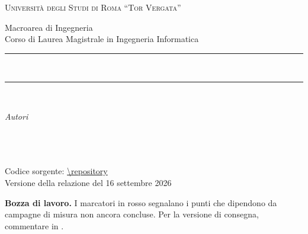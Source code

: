 \begin{titlepage}
\centering
\thispagestyle{empty}

\vspace*{1.2cm}

{\large\scshape Universit\`a degli Studi di Roma ``Tor Vergata''\par}
\vspace{0.3cm}
{\normalsize Macroarea di Ingegneria \\ Corso di Laurea Magistrale in Ingegneria Informatica\par}

\vspace{2.0cm}

\rule{\linewidth}{0.5pt}\\[0.6cm]
{\LARGE\bfseries \titolorelazione \par}
\vspace{0.5cm}
{\large \sottotitolorelazione \par}
\rule{\linewidth}{0.5pt}

\vspace{1.6cm}

{\large \corso \\ \annoaccademico \par}

\vspace{2.4cm}

\begin{minipage}{0.46\textwidth}
  \centering
  {\small\itshape Autori}\\[4pt]
  \autoreuno\\{\small\matricolauno}\\[8pt]
  \autoredue\\{\small\matricoladue}
\end{minipage}

\vfill

{\small Codice sorgente: \url{\repository}}\\[4pt]
{\small Versione della relazione del 16 settembre 2026}

\iftodovisibile
\vspace{0.8cm}
\begin{tcolorbox}[colback=todogiallo,colframe=todorosso,boxrule=0.6pt,width=0.85\linewidth]
  \small\centering
  \textcolor{todorosso}{\textbf{Bozza di lavoro.}} I marcatori in rosso segnalano
  i punti che dipendono da campagne di misura non ancora concluse. Per la
  versione di consegna, commentare  in
  .
\end{tcolorbox}
\fi

\vspace{0.5cm}
\end{titlepage}
\cleardoublepage
